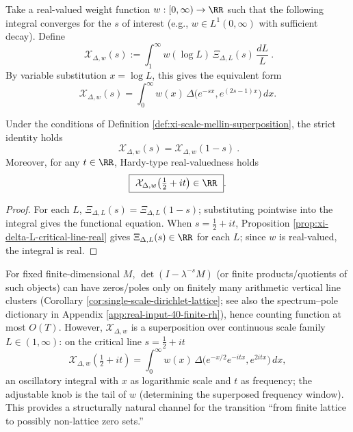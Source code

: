 \begin{definition}\label{def:xi-scale-mellin-superposition}
Take a real-valued weight function \(w:[0,\infty)\to\RR\) such that the following integral converges for the \(s\) of interest (e.g., \(w\in L^1(0,\infty)\) with sufficient decay).
Define
\[
\boxed{\ \mathcal X_{\Delta,w}(s):=\int_{1}^{\infty} w(\log L)\,\Xi_{\Delta,L}(s)\,\frac{dL}{L}\ }.
\]
By variable substitution \(x=\log L\), this gives the equivalent form
\[
\mathcal X_{\Delta,w}(s)=\int_0^\infty w(x)\,\Delta\!\bigl(e^{-sx},e^{(2s-1)x}\bigr)\,dx.
\]
\end{definition}

\begin{proposition}\label{prop:xi-scale-mellin-fe-real}
Under the conditions of Definition \ref{def:xi-scale-mellin-superposition}, the strict identity holds
\[
\boxed{\ \mathcal X_{\Delta,w}(s)=\mathcal X_{\Delta,w}(1-s)\ }.
\]
Moreover, for any \(t\in\RR\), Hardy-type real-valuedness holds
\[
\boxed{\ \mathcal X_{\Delta,w}\!\left(\tfrac12+it\right)\in\RR\ }.
\]
\end{proposition}
\begin{proof}
For each \(L\), \(\Xi_{\Delta,L}(s)=\Xi_{\Delta,L}(1-s)\); substituting pointwise into the integral gives the functional equation.
When \(s=\tfrac12+it\), Proposition \ref{prop:xi-delta-L-critical-line-real} gives \(\Xi_{\Delta,L}(s)\in\RR\) for each \(L\); since \(w\) is real-valued, the integral is real.
\end{proof}

\begin{remark}\label{rem:xi-scale-mellin-break-lattice}
For fixed finite-dimensional \(M\), \(\det(I-\lambda^{-s}M)\) (or finite products/quotients of such objects) can have zeros/poles only on finitely many arithmetic vertical line clusters (Corollary \ref{cor:single-scale-dirichlet-lattice}; see also the spectrum--pole dictionary in Appendix \ref{app:real-input-40-finite-rh}), hence counting function at most \(O(T)\).
However, \(\mathcal X_{\Delta,w}\) is a superposition over continuous scale family \(L\in(1,\infty)\): on the critical line \(s=\tfrac12+it\)
\[
\mathcal X_{\Delta,w}\!\left(\tfrac12+it\right)=\int_0^\infty w(x)\,\Delta\!\bigl(e^{-x/2}e^{-itx},e^{2itx}\bigr)\,dx,
\]
an oscillatory integral with \(x\) as logarithmic scale and \(t\) as frequency; the adjustable knob is the tail of \(w\) (determining the superposed frequency window).
This provides a structurally natural channel for the transition ``from finite lattice to possibly non-lattice zero sets.''
\end{remark}

